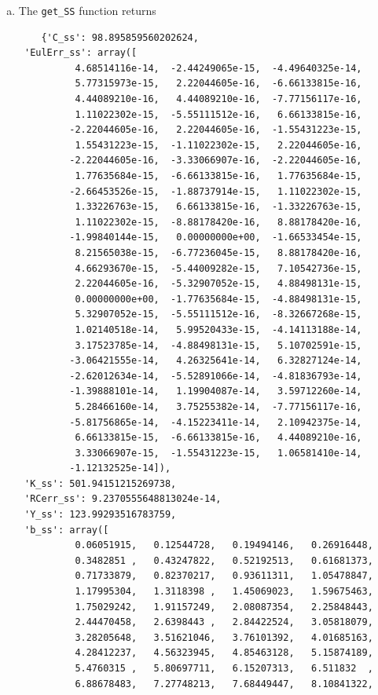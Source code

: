 \documentclass[letterpaper,12pt]{article}
\theoremstyle{definition}
\begin{document}
\begin{enumerate}
	\begin{enumerate}[(a)]
	\item The \texttt{get\_SS} function returns
	\begin{verbatim}
	{'C_ss': 98.895859560202624,
 'EulErr_ss': array([  
          4.68514116e-14,  -2.44249065e-15,  -4.49640325e-14,
          5.77315973e-15,   2.22044605e-16,  -6.66133815e-16,
          4.44089210e-16,   4.44089210e-16,  -7.77156117e-16,
          1.11022302e-15,  -5.55111512e-16,   6.66133815e-16,
         -2.22044605e-16,   2.22044605e-16,  -1.55431223e-15,
          1.55431223e-15,  -1.11022302e-15,   2.22044605e-16,
         -2.22044605e-16,  -3.33066907e-16,  -2.22044605e-16,
          1.77635684e-15,  -6.66133815e-16,   1.77635684e-15,
         -2.66453526e-15,  -1.88737914e-15,   1.11022302e-15,
          1.33226763e-15,   6.66133815e-16,  -1.33226763e-15,
          1.11022302e-15,  -8.88178420e-16,   8.88178420e-16,
         -1.99840144e-15,   0.00000000e+00,  -1.66533454e-15,
          8.21565038e-15,  -6.77236045e-15,   8.88178420e-16,
          4.66293670e-15,  -5.44009282e-15,   7.10542736e-15,
          2.22044605e-16,  -5.32907052e-15,   4.88498131e-15,
          0.00000000e+00,  -1.77635684e-15,  -4.88498131e-15,
          5.32907052e-15,  -5.55111512e-16,  -8.32667268e-15,
          1.02140518e-14,   5.99520433e-15,  -4.14113188e-14,
          3.17523785e-14,  -4.88498131e-15,   5.10702591e-15,
         -3.06421555e-14,   4.26325641e-14,   6.32827124e-14,
         -2.62012634e-14,  -5.52891066e-14,  -4.81836793e-14,
         -1.39888101e-14,   1.19904087e-14,   3.59712260e-14,
          5.28466160e-14,   3.75255382e-14,  -7.77156117e-16,
         -5.81756865e-14,  -4.15223411e-14,   2.10942375e-14,
          6.66133815e-15,  -6.66133815e-16,   4.44089210e-16,
          3.33066907e-15,  -1.55431223e-15,   1.06581410e-14,
         -1.12132525e-14]),
 'K_ss': 501.94151215269738,
 'RCerr_ss': 9.2370555648813024e-14,
 'Y_ss': 123.99293516783759,
 'b_ss': array([  
          0.06051915,   0.12544728,   0.19494146,   0.26916448,
          0.3482851 ,   0.43247822,   0.52192513,   0.61681373,
          0.71733879,   0.82370217,   0.93611311,   1.05478847,
          1.17995304,   1.3118398 ,   1.45069023,   1.59675463,
          1.75029242,   1.91157249,   2.08087354,   2.25848443,
          2.44470458,   2.6398443 ,   2.84422524,   3.05818079,
          3.28205648,   3.51621046,   3.76101392,   4.01685163,
          4.28412237,   4.56323945,   4.85463128,   5.15874189,
          5.4760315 ,   5.80697711,   6.15207313,   6.511832  ,
          6.88678483,   7.27748213,   7.68449447,   8.10841322,

\end{verbatim}
\end{enumerate}
\end{enumerate}
\end{document}
